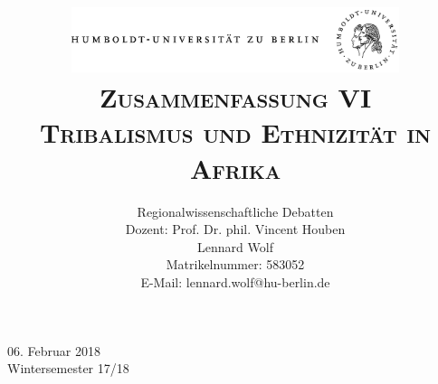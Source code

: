 \documentclass[a4paper, 12pt]{article}
\date{\vspace{-3ex}}
\begin{document}
\title{\vspace{5ex}
	\includegraphics*[bb=0 0 720 200, width=0.72\textwidth]{ErstesSem/images/hu_logo.png}\\
	\vspace{30pt}
	\scshape\LARGE{Zusammenfassung VI}\\\Large{Tribalismus und Ethnizität in Afrika}\vspace{20pt}}
	


\author{Regionalwissenschaftliche Debatten\\
	\vspace{7pt}
          Dozent: Prof. Dr. phil. Vincent Houben\\\vspace{4pt}Lennard Wolf\\
        \small{Matrikelnummer: 583052}\\
        \small{E-Mail: lennard.wolf@hu-berlin.de}}


\maketitle

\vspace{\fill}

\begin{minipage}[]{0.92\textwidth}
    \centering
    \onehalfspacing
    \large   
    06. Februar 2018\\
    Wintersemester 17/18

    \vspace{-20mm} 
\end{minipage}%
\thispagestyle{empty}
\newpage
\setcounter{page}{1}
\end{document}
